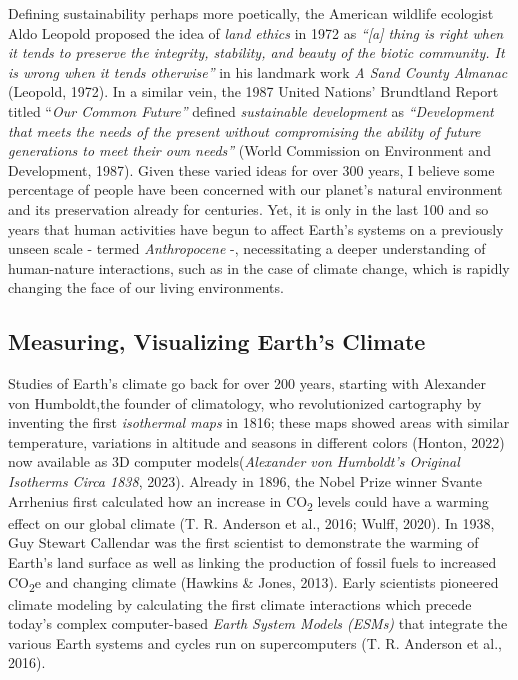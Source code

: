 \documentclass[
  letterpaper,
  DIV=11,
  numbers=noendperiod]{scrartcl}
\begin{document}
Defining sustainability perhaps more poetically, the American wildlife
ecologist Aldo Leopold proposed the idea of \emph{land ethics} in 1972
as \emph{``{[}a{]} thing is right when it tends to preserve the
integrity, stability, and beauty of the biotic community. It is wrong
when it tends otherwise''} in his landmark work \emph{A Sand County
Almanac} (Leopold, 1972). In a similar vein, the 1987 United Nations'
Brundtland Report titled ``\emph{Our Common Future''} defined
\emph{sustainable development} as \emph{``Development that meets the
needs of the present without compromising the ability of future
generations to meet their own needs''} (World Commission on Environment
and Development, 1987). Given these varied ideas for over 300 years, I
believe some percentage of people have been concerned with our planet's
natural environment and its preservation already for centuries. Yet, it
is only in the last 100 and so years that human activities have begun to
affect Earth's systems on a previously unseen scale - termed
\emph{Anthropocene} -, necessitating a deeper understanding of
human-nature interactions, such as in the case of climate change, which
is rapidly changing the face of our living environments.

\subsection{Measuring, Visualizing Earth's
Climate}\label{measuring-visualizing-earths-climate}

Studies of Earth's climate go back for over 200 years, starting with
Alexander von Humboldt,the founder of climatology, who revolutionized
cartography by inventing the first \emph{isothermal maps} in 1816; these
maps showed areas with similar temperature, variations in altitude and
seasons in different colors (Honton, 2022) now available as 3D computer
models(\emph{Alexander von {Humboldt}'s Original Isotherms Circa 1838},
2023). Already in 1896, the Nobel Prize winner Svante Arrhenius first
calculated how an increase in CO\textsubscript{2} levels could have a
warming effect on our global climate (T. R. Anderson et al., 2016;
Wulff, 2020). In 1938, Guy Stewart Callendar was the first scientist to
demonstrate the warming of Earth's land surface as well as linking the
production of fossil fuels to increased CO\textsubscript{2}e and
changing climate (Hawkins \& Jones, 2013). Early scientists pioneered
climate modeling by calculating the first climate interactions which
precede today's complex computer-based \emph{Earth System Models (ESMs)}
that integrate the various Earth systems and cycles run on
supercomputers (T. R. Anderson et al., 2016).
\end{document}
